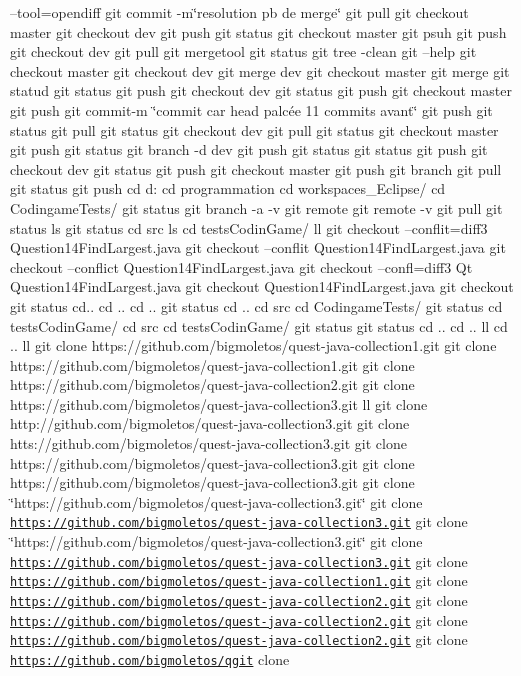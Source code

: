 --tool=opendiff git commit -\/m\char`\"{}resolution pb de merge\char`\"{} git pull git checkout master git checkout dev git push git status git checkout master git psuh git push git checkout dev git pull git mergetool git status git tree -\/clean git --help git checkout master git checkout dev git merge dev git checkout master git merge git statud git status git push git checkout dev git status git push git checkout master git push git commit-\/m \char`\"{}commit car head palcée 11 commits avant\char`\"{} git push git status git pull git status git checkout dev git pull git status git checkout master git push git status git branch -\/d dev git push git status git status git push git checkout dev git status git push git checkout master git push git branch git pull git status git push cd d\+: cd programmation cd workspaces\+\_\+\+Eclipse/ cd Codingame\+Tests/ git status git branch -\/a -\/v git remote git remote -\/v git pull git status ls git status cd src ls cd tests\+Codin\+Game/ ll git checkout --conflit=diff3 Question14\+Find\+Largest.\+java git checkout --conflit Question14\+Find\+Largest.\+java git checkout --conflict Question14\+Find\+Largest.\+java git checkout --confl=diff3 Qt Question14\+Find\+Largest.\+java git checkout Question14\+Find\+Largest.\+java git checkout git status cd.. cd .. cd .. git status cd .. cd src cd Codingame\+Tests/ git status cd tests\+Codin\+Game/ cd src cd tests\+Codin\+Game/ git status git status cd .. cd .. ll cd .. ll git clone https\+://github.com/bigmoletos/quest-\/java-\/collection1.\+git git clone https\+://github.com/bigmoletos/quest-\/java-\/collection1.\+git git clone https\+://github.com/bigmoletos/quest-\/java-\/collection2.\+git git clone https\+://github.com/bigmoletos/quest-\/java-\/collection3.\+git ll git clone http\+://github.com/bigmoletos/quest-\/java-\/collection3.\+git git clone htts\+://github.com/bigmoletos/quest-\/java-\/collection3.\+git git clone https\+://github.com/bigmoletos/quest-\/java-\/collection3.\+git git clone https\+://github.com/bigmoletos/quest-\/java-\/collection3.\+git git clone \char`\"{}https\+://github.\+com/bigmoletos/quest-\/java-\/collection3.\+git\char`\"{} git clone \textquotesingle{}\href{https://github.com/bigmoletos/quest-java-collection3.git'}{\tt https\+://github.\+com/bigmoletos/quest-\/java-\/collection3.\+git\textquotesingle{}} git clone \char`\"{}https\+://github.\+com/bigmoletos/quest-\/java-\/collection3.\+git\char`\"{} git clone \href{https://github.com/bigmoletos/quest-java-collection3.git}{\tt https\+://github.\+com/bigmoletos/quest-\/java-\/collection3.\+git} git clone \href{https://github.com/bigmoletos/quest-java-collection1.git}{\tt https\+://github.\+com/bigmoletos/quest-\/java-\/collection1.\+git} git clone \href{https://github.com/bigmoletos/quest-java-collection2.git}{\tt https\+://github.\+com/bigmoletos/quest-\/java-\/collection2.\+git} git clone \href{https://github.com/bigmoletos/quest-java-collection2.git}{\tt https\+://github.\+com/bigmoletos/quest-\/java-\/collection2.\+git} git clone \href{https://github.com/bigmoletos/quest-java-collection2.git}{\tt https\+://github.\+com/bigmoletos/quest-\/java-\/collection2.\+git} git clone \href{https://github.com/bigmoletos/qgit}{\tt https\+://github.\+com/bigmoletos/qgit} clone 